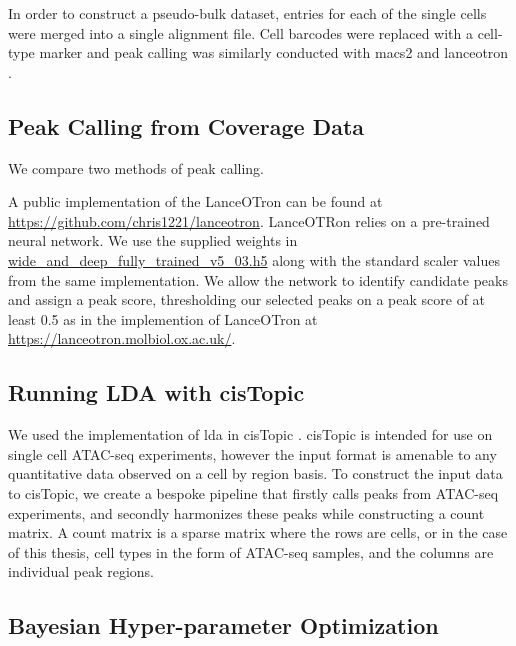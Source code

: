In order to construct a pseudo-bulk dataset, entries for each of the single cells were merged into a single alignment file. Cell barcodes were replaced with a cell-type marker and peak calling was similarly conducted with macs2 and lanceotron \cite{Gaspar2018, Hentges2021}.

\subsection{Peak Calling from Coverage Data} \label{ch4:method_peaks}

We compare two methods of peak calling.

A public implementation of the LanceOTron can be found at \url{https://github.com/chris1221/lanceotron}. LanceOTRon relies on a pre-trained neural network. We use the supplied weights in \url{wide_and_deep_fully_trained_v5_03.h5} along with the standard scaler values from the same implementation. We allow the network to identify candidate peaks and assign a peak score, thresholding our selected peaks on a peak score of at least 0.5 as in the implemention of LanceOTron at \url{https://lanceotron.molbiol.ox.ac.uk/}.


\subsection{Running LDA with cisTopic} \label{ch4:method_cistopic}

We used the implementation of \gls{lda} in cisTopic \cite{BravoGonzalez-Blas2019}. cisTopic is intended for use on single cell ATAC-seq experiments, however the input format is amenable to any quantitative data observed on a cell by region basis. To construct the input data to cisTopic, we create a bespoke pipeline that firstly calls peaks from ATAC-seq experiments, and secondly harmonizes these peaks while constructing a count matrix. A count matrix is a sparse matrix where the rows are cells, or in the case of this thesis, cell types in the form of ATAC-seq samples, and the columns are individual peak regions.

\subsection{Bayesian Hyper-parameter Optimization} \label{ch4:hyper}

